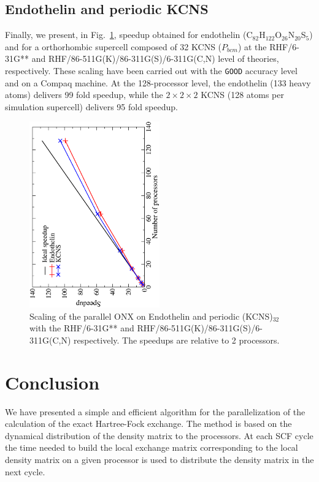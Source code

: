 \documentclass[prl,twocolumn,showpacs,twocolumngrid,superbib]{revtex4}
\begin{document}
\subsection{Endothelin and periodic KCNS}
Finally, we present, in Fig.~\ref{fig:Endothelin_KCNS}, speedup obtained for 
endothelin (C$_{82}$H$_{122}$O$_{26}$N$_{20}$S$_5$) and
for a orthorhombic supercell composed of 32 KCNS ($P_{bcm}$)
at the RHF/6-31G** and RHF/86-511G(K)/86-311G(S)/6-311G(C,N) 
level of theories, respectively.
These scaling have been carried out with the {\tt GOOD} accuracy level 
and on a Compaq machine.
At the 128-processor level, the endothelin (133 heavy atoms) delivers 99 fold
speedup, while the $2\times 2\times 2$ KCNS (128 atoms per simulation supercell)
delivers 95 fold speedup. 

\begin{figure}[p]
  \caption{\protect
    Scaling of the parallel ONX on Endothelin and periodic (KCNS)$_32$ with 
    the RHF/6-31G** and RHF/86-511G(K)/86-311G(S)/6-311G(C,N) respectively.
    The speedups are relative to 2 processors.
  }\label{fig:Endothelin_KCNS}
  \includegraphics[angle=-90,width=0.5\textwidth]{Endothelin_KCNS}
\end{figure}

\section{Conclusion}\label{Sec:Conc}

 We have presented a simple and efficient algorithm for 
 the parallelization of the calculation of the exact Hartree-Fock
 exchange. The method is based on the dynamical distribution 
 of the density matrix to the processors. At each SCF cycle the
 time needed to build the local exchange matrix corresponding
 to the local density matrix on a given processor is used to
 distribute the density matrix in the next cycle. 
\end{document}
